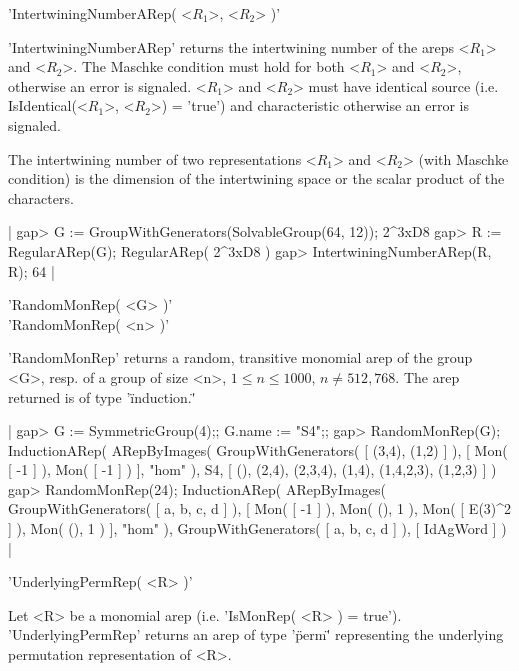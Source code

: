 
'IntertwiningNumberARep( <$R_1$>, <$R_2$> )'

'IntertwiningNumberARep' returns the intertwining number of the 
areps <$R_1$> and <$R_2$>. The Maschke condition must hold for both 
<$R_1$> and <$R_2$>, otherwise an error is signaled.
<$R_1$> and <$R_2$> must have identical source 
(i.e. IsIdentical(<$R_1$>, <$R_2$>) = 'true') 
and characteristic otherwise an error is signaled.

The intertwining number of two representations <$R_1$> and <$R_2$>
(with Maschke condition) is the dimension of the intertwining space
or the scalar product of the characters.

|    gap> G := GroupWithGenerators(SolvableGroup(64, 12));
    2^3xD8
    gap> R := RegularARep(G);
    RegularARep( 2^3xD8 )
    gap> IntertwiningNumberARep(R, R);
    64 |


'RandomMonRep( <G> )'\\
'RandomMonRep( <n> )'

'RandomMonRep' returns a random, transitive monomial arep
of the group <G>, resp. of a group of size <n>, $1\leq n\leq 1000$, 
$n\neq 512, 768$. The arep returned is of type '\"induction.\"' 

|    gap> G := SymmetricGroup(4);; G.name := "S4";;
    gap> RandomMonRep(G);
    InductionARep(
      ARepByImages(
        GroupWithGenerators( [ (3,4), (1,2) ] ),
        [ Mon( [ -1 ] ),
          Mon( [ -1 ] )
        ],
        "hom"
      ),
      S4,
      [ (), (2,4), (2,3,4), (1,4), (1,4,2,3), (1,2,3) ]
    )
    gap> RandomMonRep(24);
    InductionARep(
      ARepByImages(
        GroupWithGenerators( [ a, b, c, d ] ),
        [ Mon( [ -1 ] ),
          Mon( (), 1 ),
          Mon( [ E(3)^2 ] ),
          Mon( (), 1 )
        ],
        "hom"
      ),
      GroupWithGenerators( [ a, b, c, d ] ),
      [ IdAgWord ]
    ) |


'UnderlyingPermRep( <R> )'

Let <R> be a monomial arep (i.e. 'IsMonRep( <R> ) = true').
'UnderlyingPermRep' returns an arep of type '\"perm\"' 
representing the underlying permutation representation of <R>. 

